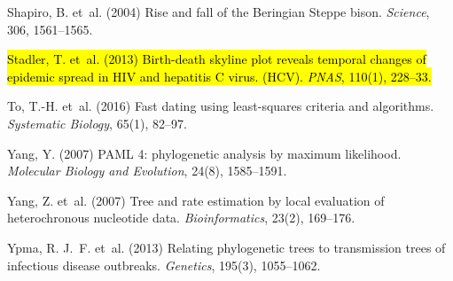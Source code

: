 \documentclass{bioinfo}
\newcommand{\edit}[1]{\hl{#1}}
\begin{document}
\begin{thebibliography}{14}
Shapiro, B. et~al. (2004) Rise and fall of the {Beringian Steppe} bison.
\newblock \emph{Science}, 306, 1561--1565.

\edit{Stadler, T. et~al. (2013) Birth-death skyline plot reveals temporal changes of epidemic spread in HIV and hepatitis C virus. (HCV).
\newblock \emph{PNAS}, 110(1), 228--33.}

To, T.-H. et~al. (2016) Fast dating using least-squares criteria and
  algorithms.
\newblock \emph{Systematic Biology}, 65(1), 82--97.

Yang, Y. (2007) {PAML} 4: phylogenetic analysis by maximum likelihood.
\newblock \emph{Molecular Biology and Evolution}, 24(8), 1585--1591.

Yang, Z. et~al. (2007) Tree and rate estimation by local evaluation of
  heterochronous nucleotide data.
\newblock \emph{Bioinformatics}, 23(2), 169--176.

Ypma, R. J.~F. et~al. (2013) Relating phylogenetic trees to transmission trees
  of infectious disease outbreaks.
\newblock \emph{Genetics}, 195(3), 1055--1062.

\end{thebibliography}
\end{document}
